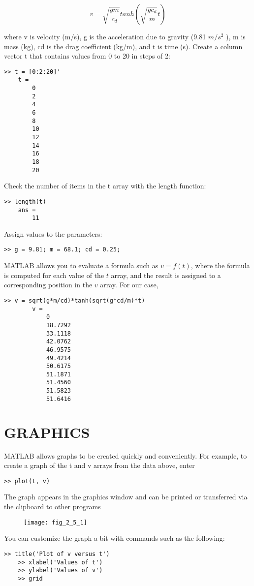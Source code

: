 \documentclass[../main.tex]{subfiles}
\begin{document}
$$ v= \sqrt{\dfrac{gm}{c_d}}tanh \left( \sqrt{\dfrac{gc_d}{m}}t \right) $$

where v is velocity (m/s), g is the acceleration due to gravity (9.81 $m/s^2$
), m is mass (kg),
cd is the drag coefficient (kg/m), and t is time (s).
Create a column vector t that contains values from 0 to 20 in steps of 2:
\begin{lstlisting}[frame=none, numbers=none]
	>> t = [0:2:20]'
	t =
		0
		2
		4
		6
		8
		10
		12
		14
		16
		18
		20
\end{lstlisting}
Check the number of items in the t array with the length function:
\begin{lstlisting}[frame=none, numbers=none]
	>> length(t)
	ans =
		11
\end{lstlisting}
Assign values to the parameters:
\begin{lstlisting}[frame=none, numbers=none]
	>> g = 9.81; m = 68.1; cd = 0.25;
\end{lstlisting}
MATLAB allows you to evaluate a formula such as $v = f (t)$, where the formula is
computed for each value of the $t$ array, and the result is assigned to a corresponding position in the $v$ array. For our case,

	\begin{lstlisting}[frame=none, numbers=none]
		>> v = sqrt(g*m/cd)*tanh(sqrt(g*cd/m)*t)
		v =
			0
			18.7292
			33.1118
			42.0762
			46.9575
			49.4214
			50.6175
			51.1871
			51.4560
			51.5823
			51.6416
	\end{lstlisting}



\section{GRAPHICS}

MATLAB allows graphs to be created quickly and conveniently. For example, to create a
graph of the t and v arrays from the data above, enter
\begin{lstlisting}[frame=none, numbers=none]
	>> plot(t, v)
\end{lstlisting}
The graph appears in the graphics window and can be printed or transferred via the clipboard to other programs

\begin{figure}[H]
	\centering
	\texttt{[image: fig\_2\_5\_1]}
   
\end{figure}

You can customize the graph a bit with commands such as the following:
\begin{lstlisting}[frame=none, numbers=none]
	>> title('Plot of v versus t')
	>> xlabel('Values of t')
	>> ylabel('Values of v')
	>> grid
\end{lstlisting}
\end{document}

